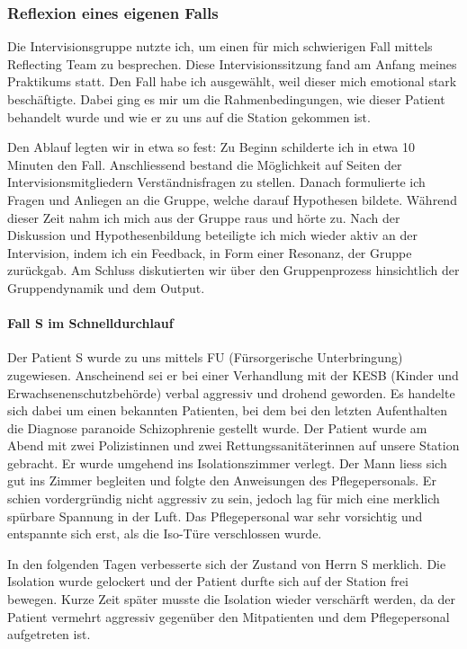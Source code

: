 \subsubsection{Reflexion eines eigenen Falls}
Die Intervisionsgruppe nutzte ich, um einen für mich  schwierigen Fall mittels Reflecting Team zu besprechen. Diese Intervisionssitzung fand am Anfang meines Praktikums statt. Den Fall habe ich ausgewählt, weil dieser mich emotional stark beschäftigte. Dabei ging es mir um die Rahmenbedingungen, wie dieser Patient behandelt wurde und wie er zu uns auf die Station gekommen ist. 

Den Ablauf legten wir in etwa so fest: Zu Beginn schilderte ich in etwa 10 Minuten den Fall. Anschliessend bestand die Möglichkeit auf Seiten der Intervisionsmitgliedern Verständnisfragen zu stellen. Danach formulierte ich Fragen und Anliegen an die Gruppe, welche darauf Hypothesen bildete. Während dieser Zeit nahm ich mich aus der Gruppe raus und hörte zu. Nach der Diskussion und Hypothesenbildung beteiligte ich mich wieder aktiv an der Intervision, indem ich ein Feedback, in Form einer Resonanz, der Gruppe zurückgab. Am Schluss diskutierten wir über den Gruppenprozess hinsichtlich der Gruppendynamik und dem Output.

\paragraph{Fall S im Schnelldurchlauf}
Der Patient S wurde zu uns mittels FU (Fürsorgerische Unterbringung) zugewiesen. Anscheinend sei er bei einer Verhandlung mit der KESB (Kinder und Erwachsenenschutzbehörde) verbal aggressiv und drohend geworden. Es handelte sich dabei um einen bekannten Patienten, bei dem bei den letzten Aufenthalten die Diagnose paranoide Schizophrenie gestellt wurde. Der Patient wurde am Abend mit zwei Polizistinnen und zwei Rettungssanitäterinnen auf unsere Station gebracht. Er wurde umgehend ins Isolationszimmer verlegt. Der Mann liess sich gut ins Zimmer begleiten und folgte den Anweisungen des Pflegepersonals. Er schien vordergründig nicht aggressiv zu sein, jedoch lag für mich eine merklich spürbare Spannung in der Luft. Das Pflegepersonal war sehr vorsichtig und entspannte sich erst, als die Iso-Türe verschlossen wurde.

In den folgenden Tagen verbesserte sich der Zustand von Herrn S merklich. Die Isolation wurde gelockert und der Patient durfte sich auf der Station frei bewegen. Kurze Zeit später musste die Isolation wieder verschärft werden, da der Patient vermehrt aggressiv gegenüber den Mitpatienten und dem Pflegepersonal aufgetreten ist. 

